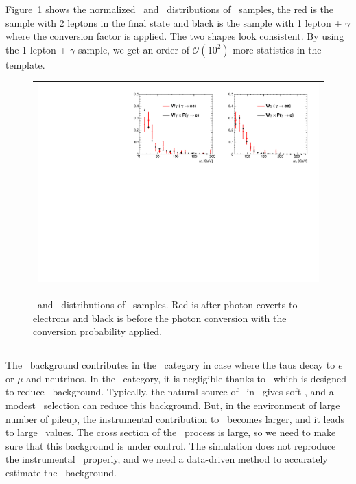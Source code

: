 Figure~\ref{fig:wgamma_compare} shows the normalized \mll\ and \mT\ distributions 
of \wgamma\ samples, the red is the sample with 2 leptons in the final state 
and black is the sample with 1 lepton + $\gamma$ where the conversion 
factor is applied. The two shapes look consistent. 
By using the 1 lepton + $\gamma$ sample, we get an order of $\mathcal{O}(10^2)$ 
more statistics in the template.  
\begin{figure}[htp] 
\centering 
\begin{tabular}{c} 
\includegraphics[width=1.0\textwidth]{figures/Wgamma_0j_of.pdf} 
\end{tabular} 
\caption{\mll\ and \mT\ distributions of \wgamma\ samples. 
Red is after photon coverts to electrons and black is before the photon conversion 
with the conversion probability applied. }
\label{fig:wgamma_compare} 
\end{figure}  



\subsection{\ztt}

The \ztt\ background contributes in the \DF\ category in case where 
the taus decay to $e$ or $\mu$ and neutrinos. 
In the \SF\ category, it is negligible thanks to \pmet\ which is 
designed to reduce \ztt\ background. 
Typically, the natural source 
of \met\ in \ztt\ gives soft \met, and a modest \met\ selection can  
reduce this background. But, in the environment of large number of pileup, 
the instrumental contribution to \met\ becomes larger, and it leads to large 
\met\ values. The cross section of the \ztt\ process is large, so we need to make 
sure that this background is under control. The simulation does not reproduce 
the instrumental \met\ properly, and we need a data-driven method to 
accurately estimate the \ztt\ background. 

